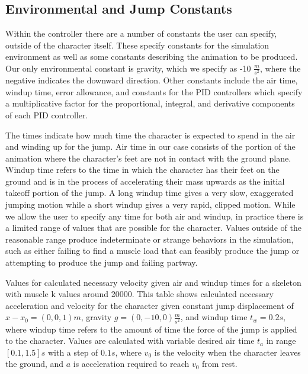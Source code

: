 \subsection{Environmental and Jump Constants}
\label{subsection:user_constants}
Within the controller there are a number of constants the user can specify, outside of the character itself.  These specify constants for the simulation environment as well as some constants describing the animation to be produced.  Our only environmental constant is gravity, which we specify as -10 $\frac{m}{s^2}$, where the negative indicates the downward direction.  Other constants include the air time, windup time, error allowance, and constants for the PID controllers which specify a multiplicative factor for the proportional, integral, and derivative components of each PID controller.

The times indicate how much time the character is expected to spend in the air and winding up for the jump.  Air time in our case consists of the portion of the animation where the character's feet are not in contact with the ground plane.  Windup time refers to the time in which the character has their feet on the ground and is in the process of accelerating their mass upwards as the initial takeoff portion of the jump.  A long windup time gives a very slow, exaggerated jumping motion while a short windup gives a very rapid, clipped motion.  While we allow the user to specify any time for both air and windup, in practice there is a limited range of values that are possible for the character.  Values outside of the reasonable range produce indeterminate or strange behaviors in the simulation, such as either failing to find a muscle load that can feasibly produce the jump or attempting to produce the jump and failing partway.

\begin{table}[ht]
	\centering
	
	\caption{Values for calculated necessary velocity given air and windup times for a skeleton with muscle k values around 20000. This table shows calculated necessary acceleration and velocity for the character given constant jump displacement of $x - x_0 = (0, 0, 1)m$, gravity $g=(0, -10, 0)\frac{m}{s^2}$, and windup time $t_w = 0.2s$, where windup time refers to the amount of time the force of the jump is applied to the character. Values are calculated with variable desired air time $t_a$ in range $[0.1, 1.5]s$ with a step of $0.1s$, where $v_0$ is the velocity when the character leaves the ground, and $a$ is acceleration required to reach $v_0$ from rest.}
\end{table}


